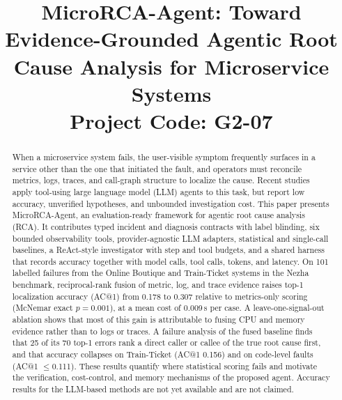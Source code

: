 \documentclass[conference]{IEEEtran}
\begin{document}
\title{MicroRCA-Agent: Toward Evidence-Grounded Agentic Root Cause Analysis for Microservice Systems\\
\large Project Code: G2-07}

\author{
\and
{}
\and
{}
\and
{}
}

\maketitle

\begin{abstract}
When a microservice system fails, the user-visible symptom frequently surfaces in a service other than the one that initiated the fault, and operators must reconcile metrics, logs, traces, and call-graph structure to localize the cause. Recent studies apply tool-using large language model (LLM) agents to this task, but report low accuracy, unverified hypotheses, and unbounded investigation cost. This paper presents MicroRCA-Agent, an evaluation-ready framework for agentic root cause analysis (RCA). It contributes typed incident and diagnosis contracts with label blinding, six bounded observability tools, provider-agnostic LLM adapters, statistical and single-call baselines, a ReAct-style investigator with step and tool budgets, and a shared harness that records accuracy together with model calls, tool calls, tokens, and latency. On 101 labelled failures from the Online Boutique and Train-Ticket systems in the Nezha benchmark, reciprocal-rank fusion of metric, log, and trace evidence raises top-1 localization accuracy (AC@1) from 0.178 to 0.307 relative to metrics-only scoring (McNemar exact $p=0.001$), at a mean cost of 0.009\,s per case. A leave-one-signal-out ablation shows that most of this gain is attributable to fusing CPU and memory evidence rather than to logs or traces. A failure analysis of the fused baseline finds that 25 of its 70 top-1 errors rank a direct caller or callee of the true root cause first, and that accuracy collapses on Train-Ticket (AC@1 0.156) and on code-level faults (AC@1 $\le$0.111). These results quantify where statistical scoring fails and motivate the verification, cost-control, and memory mechanisms of the proposed agent. Accuracy results for the LLM-based methods are not yet available and are not claimed.
\end{abstract}
\end{document}
